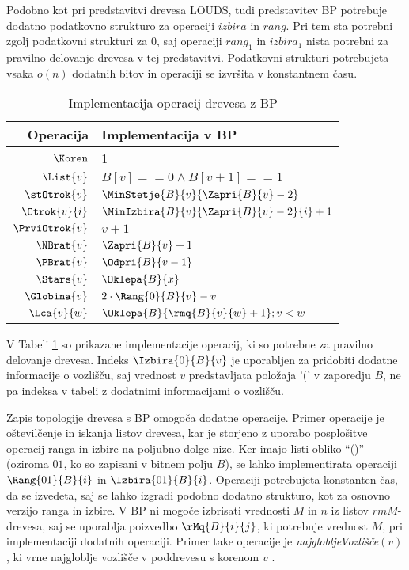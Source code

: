 Podobno kot pri predstavitvi drevesa LOUDS, tudi predstavitev BP potrebuje dodatno podatkovno strukturo za operaciji $izbira$ in $rang$. Pri tem sta potrebni zgolj podatkovni strukturi za $0$, saj  operaciji $rang_1$ in $izbira_1$ nista potrebni za pravilno delovanje drevesa v tej predstavitvi. Podatkovni strukturi potrebujeta vsaka $o(n)$ dodatnih bitov in operaciji se izvršita v konstantnem času.

\begin{table}[htb]
    \centering
      \caption{Implementacija operacij drevesa z BP}
    \begin{tabular}{r|l}
\textbf{Operacija}& \textbf{Implementacija v BP} \\\hline
         $\Koren$ &   1\\
         $\List{v}$ &    $B[v]==0 \wedge B[v+1]==1$\\
         $\stOtrok{v}$&  $\MinStetje{B}{v}{\Zapri{B}{v}-2}$\\
         $\Otrok{v}{i}$ &    $\MinIzbira{B}{v}{\Zapri{B}{v}-2}{i}+1$\\
         $\PrviOtrok{v}$&    $v+1$\\
         $\NBrat{v}$ &      $\Zapri{B}{v}+1$ \\
         $\PBrat{v}$ &      $\Odpri{B}{v-1}$ \\
         $\Stars{v}$ &      $\Oklepa{B}{x}$ \\
         $\Globina{v}$ &    $2\cdot \Rang{0}{B}{v}-v$ \\
         $\Lca{v}{w}$ &     $\Oklepa{B}{\rmq{B}{v}{w}+1};v<w$\\
    \end{tabular}  
    \label{tab:BPop}
\end{table}

V Tabeli \ref{tab:BPop} so prikazane implementacije operacij, ki so potrebne za pravilno delovanje drevesa. Indeks $\Izbira{0}{B}{v}$ je uporabljen za pridobiti dodatne informacije o vozlišču, saj vrednost $v$ predstavljata položaja '(' v zaporedju $B$, ne pa indeksa v tabeli z dodatnimi informacijami o vozlišču.

Zapis topologije drevesa s BP omogoča dodatne operacije. Primer operacije je oštevilčenje in iskanja listov drevesa, kar je storjeno z uporabo posplošitve operacij ranga in izbire na poljubno dolge nize. Ker imajo listi obliko \enquote{()} (oziroma $01$, ko so zapisani v bitnem polju $B$), se lahko implementirata operaciji $\Rang{01}{B}{i}$ in $\Izbira{01}{B}{i}$. Operaciji potrebujeta konstanten čas, da se izvedeta, saj se lahko izgradi podobno dodatno strukturo, kot za osnovno verzijo ranga in izbire. V BP ni mogoče izbrisati vrednosti $M$ in $n$ iz listov $rmM$-drevesa, saj se uporablja poizvedbo $\rMq{B}{i}{j}$, ki potrebuje vrednost $M$, pri implementaciji dodatnih operaciji. Primer take operacije je \textit{najglobljeVozlišče}$(v)$, ki vrne najgloblje vozlišče v poddrevesu s korenom $v$ \cite{Navarro2016}.